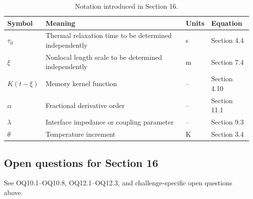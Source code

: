 \begin{table}[htbp]
\centering
\small
\caption{Notation introduced in Section 16.}
\label{tab:notation-sec16}
\begin{tabularx}{\textwidth}{@{}p{1.8cm}X p{2.2cm}p{2.1cm}@{}}
\toprule
\textbf{Symbol} & \textbf{Meaning} & \textbf{Units} & \textbf{Equation} \\
\midrule
$\tau_0$ & Thermal relaxation time to be determined independently & s & Section 4.4 \\
$\xi$ & Nonlocal length scale to be determined independently & m & Section 7.4 \\
$K(t-\xi)$ & Memory kernel function & -- & Section 4.10 \\
$\alpha$ & Fractional derivative order & -- & Section 11.1 \\
$\lambda$ & Interface impedance or coupling parameter & -- & Section 9.3 \\
$\theta$ & Temperature increment & K & Section 3.4 \\
\bottomrule
\end{tabularx}
\end{table}

\subsection{Open questions for Section 16}

See OQ10.1--OQ10.8, OQ12.1--OQ12.3, and challenge-specific open questions above.

